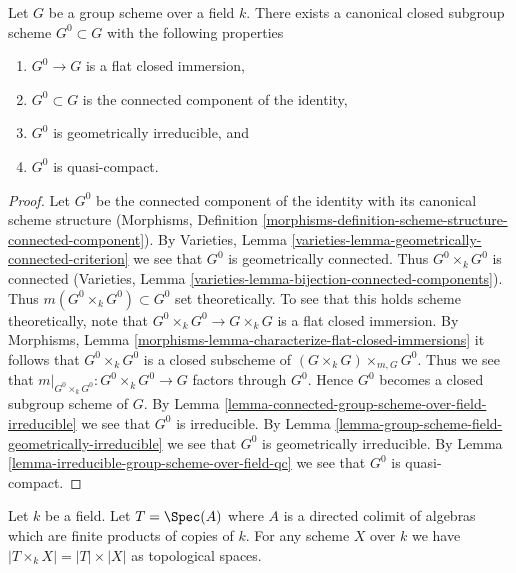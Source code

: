 \begin{proposition}
\label{proposition-connected-component}
Let $G$ be a group scheme over a field $k$. There exists a canonical closed
subgroup scheme $G^0 \subset G$ with the following properties
\begin{enumerate}
\item $G^0 \to G$ is a flat closed immersion,
\item $G^0 \subset G$ is the connected component of the identity,
\item $G^0$ is geometrically irreducible, and
\item $G^0$ is quasi-compact.
\end{enumerate}
\end{proposition}

\begin{proof}
Let $G^0$ be the connected component of the identity with its canonical
scheme structure (Morphisms, Definition
\ref{morphisms-definition-scheme-structure-connected-component}).
By Varieties, Lemma \ref{varieties-lemma-geometrically-connected-criterion}
we see that $G^0$ is geometrically connected. Thus
$G^0 \times_k G^0$ is connected
(Varieties, Lemma \ref{varieties-lemma-bijection-connected-components}).
Thus $m(G^0 \times_k G^0) \subset G^0$ set theoretically.
To see that this holds scheme theoretically, note that
$G^0 \times_k G^0 \to G \times_k G$ is a flat closed immersion.
By Morphisms, Lemma \ref{morphisms-lemma-characterize-flat-closed-immersions}
it follows that $G^0 \times_k G^0$ is a closed subscheme of
$(G \times_k G) \times_{m, G} G^0$. Thus we see that
$m|_{G^0 \times_k G^0} : G^0 \times_k G^0 \to G$ factors through
$G^0$. Hence $G^0$ becomes a closed subgroup scheme of $G$.
By Lemma \ref{lemma-connected-group-scheme-over-field-irreducible}
we see that $G^0$ is irreducible. By
Lemma \ref{lemma-group-scheme-field-geometrically-irreducible}
we see that $G^0$ is geometrically irreducible. By
Lemma \ref{lemma-irreducible-group-scheme-over-field-qc}
we see that $G^0$ is quasi-compact.
\end{proof}

\begin{lemma}
\label{lemma-profinite-product-over-field}
Let $k$ be a field. Let $T = \Spec(A)$ where $A$ is a directed colimit of
algebras which are finite products of copies of $k$. For any scheme $X$
over $k$ we have $|T \times_k X| = |T| \times |X|$ as topological spaces.
\end{lemma}

